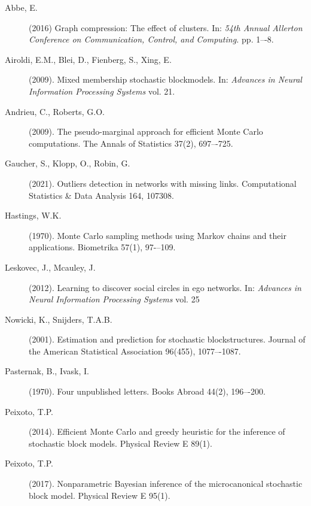 
\begin{description}

	\item[Abbe, E.] (2016) Graph compression: The effect of clusters.
	In: {\it 54th Annual Allerton Conference on Communication, Control, and Computing.} pp. 1–-8.
	
	\item[Airoldi, E.M., Blei, D., Fienberg, S., Xing, E.] (2009).
	Mixed membership stochastic blockmodels. 
	In: {\it Advances in Neural Information Processing Systems} vol. 21.

	\item[Andrieu, C., Roberts, G.O.] (2009). 
	The pseudo-marginal approach for efficient Monte Carlo computations.
	The Annals of Statistics 37(2), 697–-725.

	\item[Gaucher, S., Klopp, O., Robin, G.] (2021).
	Outliers detection in networks with missing links.
	Computational Statistics \& Data Analysis 164, 107308.

	\item[Hastings, W.K.] (1970).
	Monte Carlo sampling methods using Markov chains and their applications.
	Biometrika 57(1), 97-–109.

	\item[Leskovec, J., Mcauley, J.] (2012).
	Learning to discover social circles in ego networks.
	In: {\it Advances in Neural Information Processing Systems} vol. 25

	\item[Nowicki, K., Snijders, T.A.B.] (2001).
	Estimation and prediction for stochastic blockstructures. 
	Journal of the American Statistical Association 96(455), 1077–-1087.

	\item[Pasternak, B., Ivask, I.] (1970).
	Four unpublished letters. Books Abroad 44(2), 196–-200.

	\item[Peixoto, T.P.] (2014).
	Efficient Monte Carlo and greedy heuristic for the inference of stochastic block models.
	Physical Review E 89(1).

	\item[Peixoto, T.P.] (2017).
	Nonparametric Bayesian inference of the microcanonical
	stochastic block model. Physical Review E 95(1).


\end{description}
